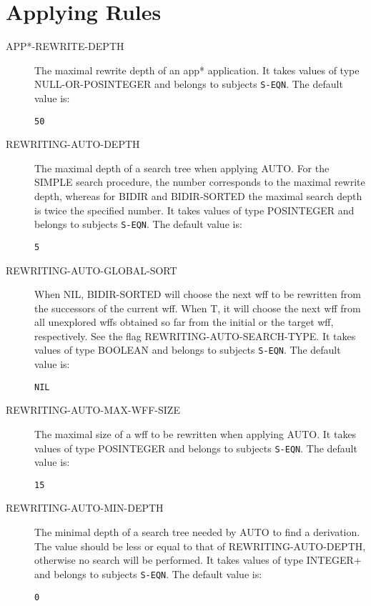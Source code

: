 \section{Applying Rules}

\begin{description} 
\item[APP*-REWRITE-DEPTH]  
The maximal rewrite depth of an app* application.
It takes values of type NULL-OR-POSINTEGER and belongs to subjects \texttt{S-EQN}.  The default value is: \begin{lstlisting}
50
\end{lstlisting}

\item[REWRITING-AUTO-DEPTH]  
The maximal depth of a search tree when applying AUTO. For the
SIMPLE search procedure, the number corresponds to the maximal rewrite
depth, whereas for BIDIR and BIDIR-SORTED the maximal search depth is
twice the specified number.
It takes values of type POSINTEGER and belongs to subjects \texttt{S-EQN}.  The default value is: \begin{lstlisting}
5
\end{lstlisting}

\item[REWRITING-AUTO-GLOBAL-SORT]  
When NIL, BIDIR-SORTED will choose the next wff to be rewritten from
the successors of the current wff. When T, it will choose the next wff from
all unexplored wffs obtained so far from the initial or the target wff,
respectively. See the flag REWRITING-AUTO-SEARCH-TYPE.
It takes values of type BOOLEAN and belongs to subjects \texttt{S-EQN}.  The default value is: \begin{lstlisting}
NIL
\end{lstlisting}

\item[REWRITING-AUTO-MAX-WFF-SIZE]  
The maximal size of a wff to be rewritten when applying AUTO.
It takes values of type POSINTEGER and belongs to subjects \texttt{S-EQN}.  The default value is: \begin{lstlisting}
15
\end{lstlisting}

\item[REWRITING-AUTO-MIN-DEPTH]  
The minimal depth of a search tree needed by AUTO to find a
derivation. The value should be less or equal to that of REWRITING-AUTO-DEPTH,
otherwise no search will be performed.
It takes values of type INTEGER+ and belongs to subjects \texttt{S-EQN}.  The default value is: \begin{lstlisting}
0
\end{lstlisting}


\end{description}
